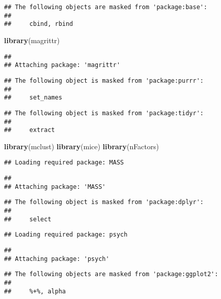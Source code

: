 \documentclass[]{article}
\newenvironment{Shaded}{\begin{snugshade}}{\end{snugshade}}
\newcommand{\KeywordTok}[1]{\textcolor[rgb]{0.13,0.29,0.53}{\textbf{#1}}}
\newcommand{\NormalTok}[1]{#1}
\begin{document}
\begin{verbatim}
## The following objects are masked from 'package:base':
## 
##     cbind, rbind
\end{verbatim}

\begin{Shaded}
\begin{Highlighting}[]
\KeywordTok{library}\NormalTok{(magrittr)}
\end{Highlighting}
\end{Shaded}

\begin{verbatim}
## 
## Attaching package: 'magrittr'
\end{verbatim}

\begin{verbatim}
## The following object is masked from 'package:purrr':
## 
##     set_names
\end{verbatim}

\begin{verbatim}
## The following object is masked from 'package:tidyr':
## 
##     extract
\end{verbatim}

\begin{Shaded}
\begin{Highlighting}[]
\KeywordTok{library}\NormalTok{(mclust)}
\KeywordTok{library}\NormalTok{(mice)}
\KeywordTok{library}\NormalTok{(nFactors)}
\end{Highlighting}
\end{Shaded}

\begin{verbatim}
## Loading required package: MASS
\end{verbatim}

\begin{verbatim}
## 
## Attaching package: 'MASS'
\end{verbatim}

\begin{verbatim}
## The following object is masked from 'package:dplyr':
## 
##     select
\end{verbatim}

\begin{verbatim}
## Loading required package: psych
\end{verbatim}

\begin{verbatim}
## 
## Attaching package: 'psych'
\end{verbatim}

\begin{verbatim}
## The following objects are masked from 'package:ggplot2':
## 
##     %+%, alpha
\end{verbatim}
\end{document}
